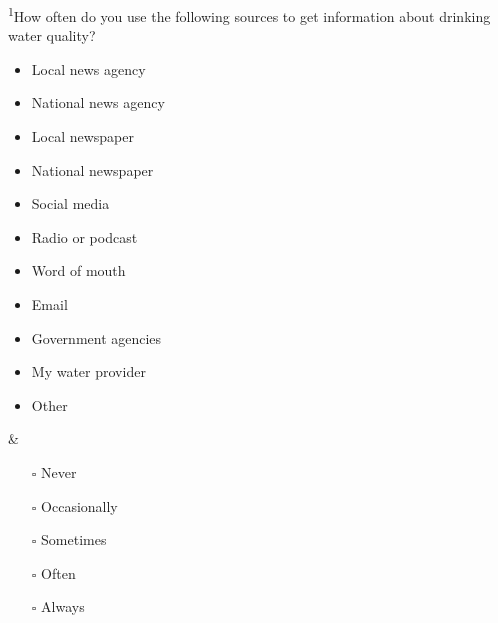 \documentclass[
]{article}
\begin{document}
\begin{longtblr}[         %
caption={},
entry=none,label=none,
note{1}={Matrix style question.},
label=tblr:quest,
caption={Survey questions.},
]
\textsuperscript{1}How often do you use the following sources to get information about drinking water quality?    \begin{itemize}[nosep]    \item Local news agency    \item National news agency    \item Local newspaper    \item National newspaper    \item Social media    \item Radio or podcast    \item Word of mouth    \item Email    \item Government agencies    \item My water provider    \item Other    \end{itemize} & \begin{itemize}[nosep]    \item[$\square$] Never    \item[$\square$] Occasionally    \item[$\square$] Sometimes    \item[$\square$] Often    \item[$\square$] Always    \end{itemize}                                                                                                                                                                                                                                                                                                                                                                                                                                        \\
\bottomrule
\end{longtblr}
\end{document}
